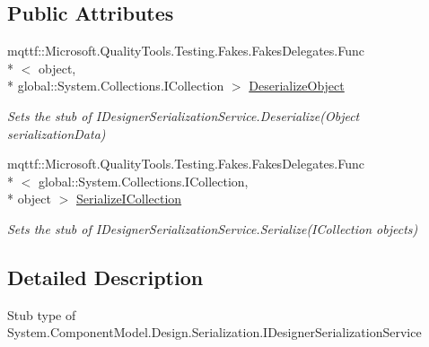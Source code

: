 \subsection*{Public Attributes}
\begin{DoxyCompactItemize}
\item 
mqttf\-::\-Microsoft.\-Quality\-Tools.\-Testing.\-Fakes.\-Fakes\-Delegates.\-Func\\*
$<$ object, \\*
global\-::\-System.\-Collections.\-I\-Collection $>$ \hyperlink{class_system_1_1_component_model_1_1_design_1_1_serialization_1_1_fakes_1_1_stub_i_designer_serialization_service_a0e420e015f3cb5db169522569e56e4e1}{Deserialize\-Object}
\begin{DoxyCompactList}\small\item\em Sets the stub of I\-Designer\-Serialization\-Service.\-Deserialize(\-Object serialization\-Data)\end{DoxyCompactList}\item 
mqttf\-::\-Microsoft.\-Quality\-Tools.\-Testing.\-Fakes.\-Fakes\-Delegates.\-Func\\*
$<$ global\-::\-System.\-Collections.\-I\-Collection, \\*
object $>$ \hyperlink{class_system_1_1_component_model_1_1_design_1_1_serialization_1_1_fakes_1_1_stub_i_designer_serialization_service_ad2d76f7c4411974736767e6fe16386a6}{Serialize\-I\-Collection}
\begin{DoxyCompactList}\small\item\em Sets the stub of I\-Designer\-Serialization\-Service.\-Serialize(\-I\-Collection objects)\end{DoxyCompactList}\end{DoxyCompactItemize}


\subsection{Detailed Description}
Stub type of System.\-Component\-Model.\-Design.\-Serialization.\-I\-Designer\-Serialization\-Service



